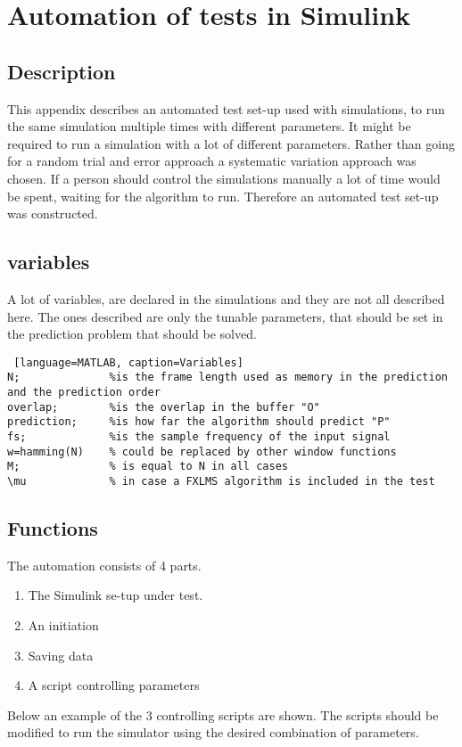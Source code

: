\section{Automation of tests in Simulink} \label{sec:SimulinkAuto}
\subsection{Description}
This appendix describes an automated test set-up used with simulations, to run the same simulation multiple times with different parameters.
It might be required to run a simulation with a lot of different parameters. Rather than going for a random trial and error approach a systematic variation approach was chosen. If a person should control the simulations manually a lot of time would be spent, waiting for the algorithm to run. Therefore an automated test set-up was constructed. 

\subsection{variables}
A lot of variables, are declared in the simulations and they are not all described here. The ones described are only the tunable parameters, that should be set in the prediction problem that should be solved. 
\begin{lstlisting} [language=MATLAB, caption=Variables]
N; 				%is the frame length used as memory in the prediction and the prediction order
overlap;		%is the overlap in the buffer "O"
prediction; 	%is how far the algorithm should predict "P"
fs; 			%is the sample frequency of the input signal 
w=hamming(N)	% could be replaced by other window functions
M;				% is equal to N in all cases
\mu 			% in case a FXLMS algorithm is included in the test
\end{lstlisting}

\subsection{Functions}
 The automation consists of 4 parts. 
\begin{enumerate}
	\item The Simulink se-tup under test. 
	\item An initiation 
	\item Saving data
	\item A script controlling parameters 
\end{enumerate}  

Below an example of the 3 controlling scripts are shown. The  scripts should be modified to run the simulator using the desired combination of parameters.

